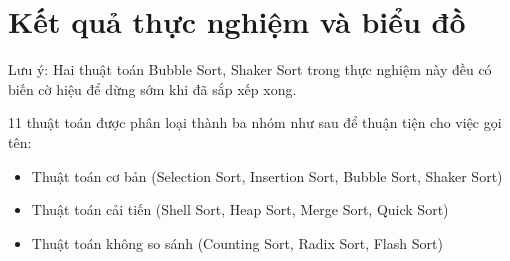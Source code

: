 \section{Kết quả thực nghiệm và biểu đồ}

Lưu ý: Hai thuật toán Bubble Sort, Shaker Sort trong thực nghiệm này đều có biến cờ hiệu để dừng sớm khi đã sắp xếp xong. 



11 thuật toán được phân loại thành ba nhóm như sau để thuận tiện cho việc gọi tên: 
\begin{itemize}
    \item Thuật toán cơ bản (Selection Sort, Insertion Sort, Bubble Sort, Shaker Sort)
    \item Thuật toán cải tiến (Shell Sort, Heap Sort, Merge Sort, Quick Sort)
    \item Thuật toán không so sánh (Counting Sort, Radix Sort, Flash Sort)
\end{itemize}


